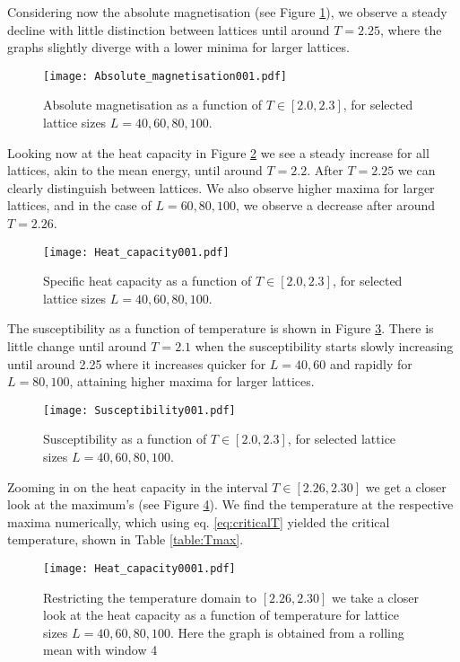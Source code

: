 Considering now the absolute magnetisation (see Figure \ref{fig:absmag}), we observe a steady decline with little distinction between lattices until around $T=2.25$, where the graphs slightly diverge with a lower minima for larger lattices.
\begin{figure}[htbp]
	\centering
	\texttt{[image: Absolute\_magnetisation001.pdf]}
	\caption{Absolute magnetisation as a function of $T \in[2.0, 2.3]$, for selected lattice sizes $L = 40, 60, 80, 100$.}
	\label{fig:absmag}
\end{figure}

Looking now at the heat capacity in Figure \ref{fig:heatcap001} we see a steady increase for all lattices, akin to the mean energy, until around $T=2.2$. After $T=2.25$ we can clearly distinguish between lattices. We also observe higher maxima for larger lattices, and in the case of $L=60, 80, 100$, we observe a decrease after around $T=2.26$.
\begin{figure}[htbp]
	\centering
	\texttt{[image: Heat\_capacity001.pdf]}
	\caption{Specific heat capacity as a function of $T \in[2.0, 2.3]$, for selected lattice sizes $L = 40, 60, 80, 100$.}
	\label{fig:heatcap001}
\end{figure}

The susceptibility as a function of temperature is shown in Figure \ref{fig:susceptibility001}. There is little change until around $T=2.1$ when the susceptibility starts slowly increasing until around 2.25 where it increases quicker for $L=40, 60$ and rapidly for $L=80, 100$, attaining higher maxima for larger lattices.
\begin{figure}[htbp]
	\centering
	\texttt{[image: Susceptibility001.pdf]}
	\caption{Susceptibility as a function of $T \in[2.0, 2.3]$, for selected lattice sizes $L = 40, 60, 80, 100$.}
	\label{fig:susceptibility001}
\end{figure}

Zooming in on the heat capacity in the interval $T \in [2.26, 2.30]$ we get a closer look at the maximum's (see Figure \ref{fig:heatcap}). We find the temperature at the respective maxima numerically, which using eq. \ref{eq:criticalT} yielded the critical temperature, shown in Table \ref{table:Tmax}.
\begin{figure}[htbp]
	\centering
	\texttt{[image: Heat\_capacity0001.pdf]}
	\caption{Restricting the temperature domain to $[2.26, 2.30]$ we take a closer look at the heat capacity as a function of temperature for lattice sizes $L=40, 60, 80, 100$. Here the graph is obtained from a rolling mean with window 4}
	\label{fig:heatcap}
\end{figure}

